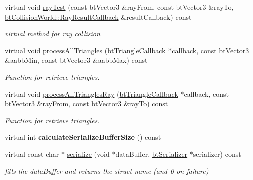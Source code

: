 \begin{DoxyCompactItemize}
virtual void \hyperlink{classbtGImpactMeshShape_ab81808ab81daed3022bcff460c797175}{ray\+Test} (const bt\+Vector3 \&ray\+From, const bt\+Vector3 \&ray\+To, \hyperlink{structbtCollisionWorld_1_1RayResultCallback}{bt\+Collision\+World\+::\+Ray\+Result\+Callback} \&result\+Callback) const
\begin{DoxyCompactList}\small\item\em virtual method for ray collision \end{DoxyCompactList}\item 
virtual void \hyperlink{classbtGImpactMeshShape_aee93cb18d43817c183fa662d9e7b32e5}{process\+All\+Triangles} (\hyperlink{classbtTriangleCallback}{bt\+Triangle\+Callback} $\ast$callback, const bt\+Vector3 \&aabb\+Min, const bt\+Vector3 \&aabb\+Max) const
\begin{DoxyCompactList}\small\item\em Function for retrieve triangles. \end{DoxyCompactList}\item 
virtual void \hyperlink{classbtGImpactMeshShape_a0c02d97f918e04fdb0e59d310861f119}{process\+All\+Triangles\+Ray} (\hyperlink{classbtTriangleCallback}{bt\+Triangle\+Callback} $\ast$callback, const bt\+Vector3 \&ray\+From, const bt\+Vector3 \&ray\+To) const
\begin{DoxyCompactList}\small\item\em Function for retrieve triangles. \end{DoxyCompactList}\item 
\mbox{\label{classbtGImpactMeshShape_ad1cc7410719e23f4322b387557788af1}} 
virtual int {\bfseries calculate\+Serialize\+Buffer\+Size} () const
\item 
\mbox{\label{classbtGImpactMeshShape_ace9ad2309fa9302faefe8f3a401e08f3}} 
virtual const char $\ast$ \hyperlink{classbtGImpactMeshShape_ace9ad2309fa9302faefe8f3a401e08f3}{serialize} (void $\ast$data\+Buffer, \hyperlink{classbtSerializer}{bt\+Serializer} $\ast$serializer) const
\begin{DoxyCompactList}\small\item\em fills the data\+Buffer and returns the struct name (and 0 on failure) \end{DoxyCompactList}\end{DoxyCompactItemize}
